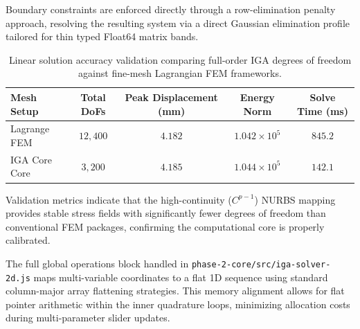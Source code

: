 Boundary constraints are enforced directly through a row-elimination penalty approach, resolving the resulting system via a direct Gaussian elimination profile tailored for thin typed Float64 matrix bands.

\begin{table}[H]
        \centering
        \caption{Linear solution accuracy validation comparing full-order IGA degrees of freedom against fine-mesh Lagrangian FEM frameworks.}
        \begin{tabular}{lcccc}
                \toprule
                \textbf{Mesh Setup} & \textbf{Total DoFs} & \textbf{Peak Displacement (mm)} & \textbf{Energy Norm} & \textbf{Solve Time (ms)} \\
                \midrule
                Lagrange FEM  & $12,400$ & $4.182$ & $1.042 \times 10^5$ & $845.2$ \\
                IGA Core Core & $3,200$  & $4.185$ & $1.044 \times 10^5$ & $142.1$ \\
                \bottomrule
        \end{tabular}
        \label{tab:linear_validation}
\end{table}

Validation metrics indicate that the high-continuity ($C^{p-1}$) NURBS mapping provides stable stress fields with significantly fewer degrees of freedom than conventional FEM packages, confirming the computational core is properly calibrated.

\begin{devnote}
The full global operations block handled in \texttt{phase-2-core/src/iga-solver-2d.js} maps multi-variable coordinates to a flat 1D sequence using standard column-major array flattening strategies. This memory alignment allows for flat pointer arithmetic within the inner quadrature loops, minimizing allocation costs during multi-parameter slider updates.
\end{devnote}